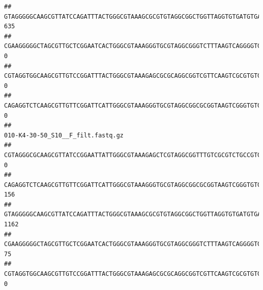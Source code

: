 \documentclass[]{article}
\begin{document}
\begin{verbatim}
## GTAGGGGGCAAGCGTTATCCAGATTTACTGGGCGTAAAGCGCGTGTAGGCGGCTGGTTAGGTGTGATGTGAAATCTTCCGGCTCAACCGGAAAACTGCATTGCAAACCGGCCTGGCTAGAGTGCAGGAGAGGGAAGCGGAATTCCAGGTGTAGCGGTGAAATGCGTAGATATCTGGAGGAACACCAGTGGCGAAGGCGGCTTCCTGGCCTGCAACTGACGCTGAGACGCGAAAGCGTGGGGAGCGAAC                               635
## CGAAGGGGGCTAGCGTTGCTCGGAATCACTGGGCGTAAAGGGTGCGTAGGCGGGTCTTTAAGTCAGGGGTGAAATCCTGGAGCTCAACTCCAGAACTGCCTTTGATACTGAAGATCTTGAGTTCGGGAGAGGTGAGTGGAACTGCGAGTGTAGAGGTGAAATTCGTAGATATTCGCAAGAACACCAGTGGCGAAGGCGGCTCACTGGCCCGATACTGACGCTGAGGCACGAAAGCGTGGGGAGCAAACA                                0
## CGTAGGTGGCAAGCGTTGTCCGGATTTACTGGGCGTAAAGAGCGCGCAGGCGGTCGTTCAAGTCGCGTGTGAAAGCCCCCGGCTCAACTGGGGAGGGTCACGCGATACTGATCGACTCGAAGGCAGGAGAGGGTAGTGGAATTCCCGGTGTAGTGGTGAAATGCGTAGATATCGGGAGGAACACCAGTGGCGAAGGCGACTACCTGGCCTGTTCTTGACGCTGAGGCGCGAAAGCTAGGGGAGCAAACG                                0
## CAGAGGTCTCAAGCGTTGTTCGGATTCATTGGGCGTAAAGGGTGCGTAGGCGGCGCGGTAAGTCGGGTGTGAAATCTCGGGGCTTAACTCCGAAACTGCATTCGATACTGCCGTGCTTGAGGACTGGAGAGGAGACTGGAATTTACGGTGTAGCGGTGAAATGCGTAGATATCGTAAGGAAGACCAGTGGCGAAGGCGGGTCTCTGGACAGTTCCTGACGCTGAGGCACGAAGGCCAGGGGAGCAAACG                                0
##                                                                                                                                                                                                                                                           010-K4-30-50_S10__F_filt.fastq.gz
## CGTAGGGCGCAAGCGTTATCCGGAATTATTGGGCGTAAAGAGCTCGTAGGCGGTTTGTCGCGTCTGCCGTGAAAGTCCGGGGCTCAACTCCGGATCTGCGGTGGGTACGGGCAGACTAGAGTGATGTAGGGGAGACTGGAATTCCTGGTGTAGCGGTGAAATGCGCAGATATCAGGAGGAACACCGATGGCGAAGGCAGGTCTCTGGGCATTAACTGACGCTGAGGAGCGAAAGCATGGGGAGCGAACA                                 0
## CAGAGGTCTCAAGCGTTGTTCGGATTCATTGGGCGTAAAGGGTGCGTAGGCGGCGCGGTAAGTCGGGTGTGAAATCTCGGAGCTTAACTCCGAAACTGCATTCGATACTGCCGTGCTTGAGGACTGGAGAGGAGACTGGAATTTACGGTGTAGCGGTGAAATGCGTAGATATCGTAAGGAAGACCAGTGGCGAAGGCGGGTCTCTGGACAGTTCCTGACGCTGAGGCACGAAGGCCAGGGGAGCAAACG                               156
## GTAGGGGGCAAGCGTTATCCAGATTTACTGGGCGTAAAGCGCGTGTAGGCGGCTGGTTAGGTGTGATGTGAAATCTTCCGGCTCAACCGGAAAACTGCATTGCAAACCGGCCTGGCTAGAGTGCAGGAGAGGGAAGCGGAATTCCAGGTGTAGCGGTGAAATGCGTAGATATCTGGAGGAACACCAGTGGCGAAGGCGGCTTCCTGGCCTGCAACTGACGCTGAGACGCGAAAGCGTGGGGAGCGAAC                               1162
## CGAAGGGGGCTAGCGTTGCTCGGAATCACTGGGCGTAAAGGGTGCGTAGGCGGGTCTTTAAGTCAGGGGTGAAATCCTGGAGCTCAACTCCAGAACTGCCTTTGATACTGAAGATCTTGAGTTCGGGAGAGGTGAGTGGAACTGCGAGTGTAGAGGTGAAATTCGTAGATATTCGCAAGAACACCAGTGGCGAAGGCGGCTCACTGGCCCGATACTGACGCTGAGGCACGAAAGCGTGGGGAGCAAACA                                75
## CGTAGGTGGCAAGCGTTGTCCGGATTTACTGGGCGTAAAGAGCGCGCAGGCGGTCGTTCAAGTCGCGTGTGAAAGCCCCCGGCTCAACTGGGGAGGGTCACGCGATACTGATCGACTCGAAGGCAGGAGAGGGTAGTGGAATTCCCGGTGTAGTGGTGAAATGCGTAGATATCGGGAGGAACACCAGTGGCGAAGGCGACTACCTGGCCTGTTCTTGACGCTGAGGCGCGAAAGCTAGGGGAGCAAACG                                 0

\end{verbatim}
\end{document}
